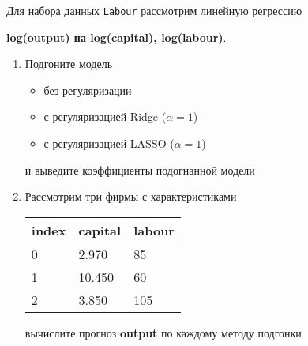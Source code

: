\begin{exercise}
Для набора данных \texttt{Labour} рассмотрим линейную регрессию 
\begin{center}
	\textbf{log(output) на log(capital), log(labour)}.
\end{center}
\begin{enumerate}
	\item Подгоните модель
	\begin{itemize}
		\item без регуляризации
		\item с регуляризацией Ridge (\(\alpha=1\))
		\item с регуляризацией LASSO (\(\alpha=1\))
	\end{itemize}
	и выведите коэффициенты подогнанной модели
	\item Рассмотрим три фирмы с характеристиками
	\begin{center}
		\begin{tabular}{|l||l|l|}\hline
			index & capital & labour \\ \hline\hline
			0 & 2.970 & 85 \\
			1 & 10.450 & 60  \\
			2 & 3.850 & 105 \\ \hline
		\end{tabular}
	\end{center}
	вычислите прогноз \textbf{output} по каждому методу подгонки
\end{enumerate}
\end{exercise}


